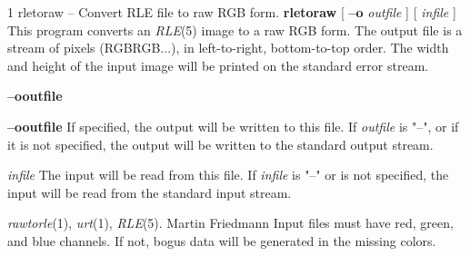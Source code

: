 %
%
%
 1
rletoraw -- Convert RLE file to raw RGB form.
{\bf rletoraw}
[
{\bf --o} 
{\it outfile}
] [
{\it infile}
]
This program converts an
{\it RLE}{\rm (5)}
image to a raw RGB form.  The output file is a stream of pixels
(RGBRGB...), in left-to-right, bottom-to-top order.  The width and
height of the input image will be printed on the standard error
stream.
\begin{TPlist}{{\bf --o}{\it }{\bf outfile}
}
\item[{{\bf --o}{\it }{\bf outfile}
}]
If specified, the output will be written to this file.  If 
{\it outfile}
is "--", or if it is not specified, the output will be written to the
standard output stream.
\item[{{\it infile}}]
The input will be read from this file.  If
{\it infile}
is "--" or is not specified, the input will be read from the standard
input stream.
\end{TPlist}
{\it rawtorle}{\rm (1),}
{\it urt}{\rm (1),}
{\it RLE}{\rm (5).}
Martin Friedmann
Input files must have red, green, and blue channels.  If not, bogus
data will be generated in the missing colors.
\newpage


